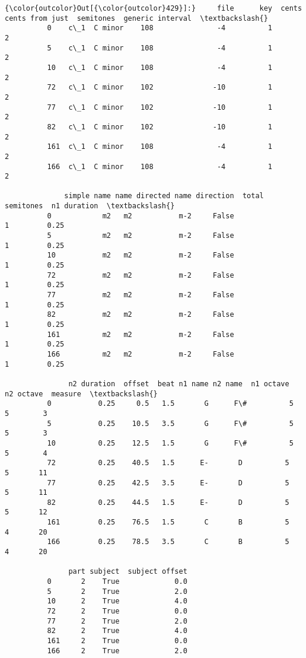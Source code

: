 \begin{Verbatim}[commandchars=\\\{\}]
{\color{outcolor}Out[{\color{outcolor}429}]:}     file      key  cents  cents from just  semitones  generic interval  \textbackslash{}
          0    c\_1  C minor    108               -4          1                 2   
          5    c\_1  C minor    108               -4          1                 2   
          10   c\_1  C minor    108               -4          1                 2   
          72   c\_1  C minor    102              -10          1                 2   
          77   c\_1  C minor    102              -10          1                 2   
          82   c\_1  C minor    102              -10          1                 2   
          161  c\_1  C minor    108               -4          1                 2   
          166  c\_1  C minor    108               -4          1                 2   
          
              simple name name directed name direction  total semitones  n1 duration  \textbackslash{}
          0            m2   m2           m-2     False                1         0.25   
          5            m2   m2           m-2     False                1         0.25   
          10           m2   m2           m-2     False                1         0.25   
          72           m2   m2           m-2     False                1         0.25   
          77           m2   m2           m-2     False                1         0.25   
          82           m2   m2           m-2     False                1         0.25   
          161          m2   m2           m-2     False                1         0.25   
          166          m2   m2           m-2     False                1         0.25   
          
               n2 duration  offset  beat n1 name n2 name  n1 octave  n2 octave  measure  \textbackslash{}
          0           0.25     0.5   1.5       G      F\#          5          5        3   
          5           0.25    10.5   3.5       G      F\#          5          5        3   
          10          0.25    12.5   1.5       G      F\#          5          5        4   
          72          0.25    40.5   1.5      E-       D          5          5       11   
          77          0.25    42.5   3.5      E-       D          5          5       11   
          82          0.25    44.5   1.5      E-       D          5          5       12   
          161         0.25    76.5   1.5       C       B          5          4       20   
          166         0.25    78.5   3.5       C       B          5          4       20   
          
               part subject  subject offset  
          0       2    True             0.0  
          5       2    True             2.0  
          10      2    True             4.0  
          72      2    True             0.0  
          77      2    True             2.0  
          82      2    True             4.0  
          161     2    True             0.0  
          166     2    True             2.0  
\end{Verbatim}



